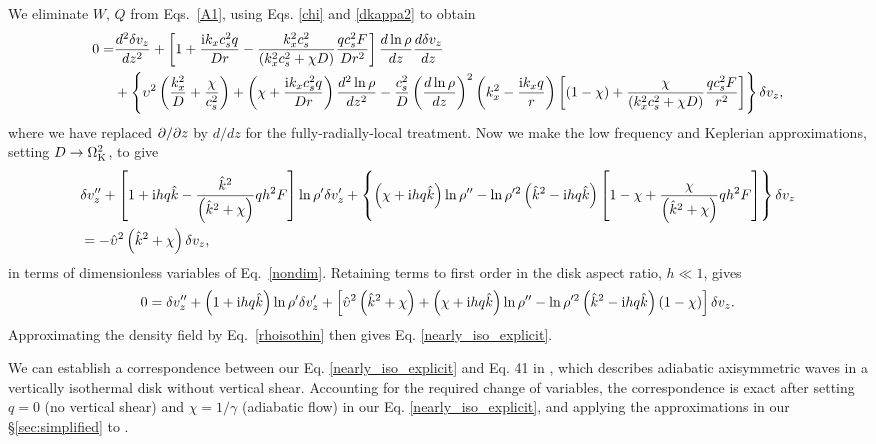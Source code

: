 We  eliminate $W,\, Q$ from Eqs.\ \ref{A1}, using  Eqs. \ref{chi} and \ref{dkappa2} to obtain  
\begin{align}\label{full_ode}
  0 =& \frac{d^2\delta v_z}{dz^2} + \left[1 + \frac{\mathrm{i} k_x c_s^2
      q}{Dr} - \frac{k_x^2c_s^2}{\left(k_x^2c_s^2 + \chi
        D\right)}\frac{qc_s^2F}{Dr^2}\right]\frac{d\ln\rho}{dz}\frac{d\delta
    v_z}{dz} \notag\\
  &+ \left\{\upsilon^2\left(\frac{k_x^2}{D} +
      \frac{\chi}{c_s^2}\right) + \left(\chi + \frac{\mathrm{i} k_x c_s^2
        q}{Dr}\right)\frac{d^2\ln\rho}{dz^2} -
    \frac{c_s^2}{D}\left(\frac{d\ln\rho}{dz}\right)^2\left(k_x^2 -
      \frac{\mathrm{i} k_x q}{r}\right)
   \left[\left(1-\chi\right) +
     \frac{\chi}{\left(k_x^2c_s^2 + \chi D\right)}\frac{qc_s^2 F}{r^2}\right] 
   \right\}\delta v_z, 
\end{align}
where we have replaced $\partial/\partial z$ by $d/dz$ for the
fully-radially-local treatment. Now we make the low frequency and Keplerian
approximations, setting $D\to 
\Omega_{\rm K}^2$, to give  
\begin{align}
  &\delta v_z ^{\prime\prime} + \left[1 + \mathrm{i} h q\hat{k} -
    \frac{ \hat{k}^2}{
      \left(\hat{k}^2+\chi\right)}q h^2F\right]\ln\rho^{\prime}\delta v_z^\prime +
  \left\{\left(\chi + \mathrm{i} h q
      \hat{k}\right)\ln\rho^{\prime\prime} - \ln\rho^{\prime
      2}\left(\hat{k}^2 -
      \mathrm{i} h
      q\hat{k}\right)\left[1 - \chi +
      \frac{\chi}{\left(\hat{k}^2+\chi\right)}qh^2F\right]\right\}\delta v_z \notag\\&=
  -\hat{\upsilon}^2\left(\hat{k}^2+\chi\right)\delta v_z\label{adia_diso3},
\end{align} 
in terms of dimensionless variables of Eq.\ \ref{nondim}. 
Retaining terms to first order in the disk aspect ratio, $h \ll 1$, gives
\begin{align}
  0= \delta v_z ^{\prime\prime} + \left(1 + \mathrm{i} h
     q\hat{k}\right)\ln\rho^{\prime}\delta v_z^\prime 
   +
   \left[\hat{\upsilon}^2\left(\hat{k}^2+\chi\right) +
     \left(  \chi + \mathrm{i} h q\hat{k}\right)\ln\rho^{\prime\prime}
     - \ln\rho^{\prime
       2}\left(\hat{k}^2 -
       \mathrm{i} h
       q\hat{k}\right)\left(1 - \chi\right)\right]\delta v_z.\label{vertiso_gov_nondim}
\end{align}
Approximating the density field by Eq.\ \ref{rhoisothin} then gives 
Eq. \ref{nearly_iso_explicit}. 

We can establish a correspondence between our  Eq. \ref{nearly_iso_explicit} and
Eq. 41 in \cite{lubow93}, which describes adiabatic axisymmetric waves in
a vertically isothermal disk without vertical shear.   Accounting for the required change of variables, 
the correspondence is exact after setting $q=0$ (no vertical shear) and
$\chi=1/\gamma$ (adiabatic flow) in our Eq. \ref{nearly_iso_explicit},
and applying the approximations in our \S \ref{sec:simplified} to \citeauthor{lubow93}.    

